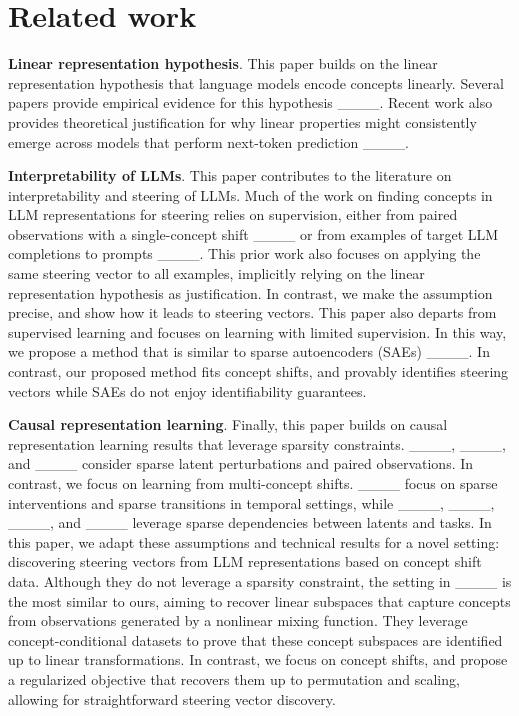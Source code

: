 \section{Related work}
\label{sec:rel}
\textbf{Linear representation hypothesis}. This paper builds on the linear representation hypothesis that language models encode concepts linearly. Several papers provide empirical evidence for this hypothesis ____. Recent work also provides theoretical justification for why linear properties might consistently emerge across models that perform next-token prediction ____.  

\textbf{Interpretability of LLMs}. This paper contributes to the literature on interpretability and steering of LLMs. Much of the work on finding concepts in LLM representations for steering relies on supervision, either from paired observations with a single-concept shift ____ or from examples of target LLM completions to prompts ____. This prior work also focuses on applying the same steering vector to all examples, implicitly relying on the linear representation hypothesis as justification. In contrast, we make the assumption precise, and show how it leads to steering vectors. This paper also departs from supervised learning and focuses on learning with limited supervision. In this way, we propose a method that is similar to sparse autoencoders (SAEs) ____. In contrast, our proposed method fits concept shifts, and provably identifies steering vectors while SAEs do not enjoy identifiability guarantees.

\textbf{Causal representation learning}. Finally, this paper builds on causal representation learning results that leverage sparsity constraints. ____, ____, and ____ consider sparse latent perturbations and paired observations. In contrast, we focus on learning from multi-concept shifts. ____ focus on sparse interventions and sparse transitions in temporal settings, while ____, ____, ____, and ____ leverage sparse dependencies between latents and tasks. In this paper, we adapt these assumptions and technical results for a novel setting: discovering steering vectors from LLM representations based on concept shift data. Although they do not leverage a sparsity constraint, the setting in ____ is the most similar to ours, aiming to recover linear subspaces that capture concepts from observations generated by a nonlinear mixing function. They leverage concept-conditional datasets to prove that these concept subspaces are identified up to linear transformations. In contrast, we focus on concept shifts, and propose a regularized objective that recovers them up to permutation and scaling, allowing for straightforward steering vector discovery. 

